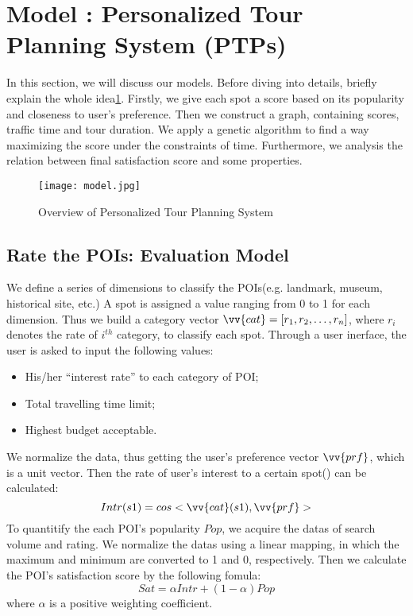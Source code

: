 \documentclass{mcmthesis}
\newcommand{\RNum}[1]{\uppercase\expandafter{\romannumeral #1\relax}}
\begin{document}
\section{Model \RNum{1}: Personalized Tour Planning System (PTPs)} \label{section:model1}
  In this section, we will discuss our models. Before diving into details, briefly explain the whole idea\ref{fig:model}. Firstly, we give each spot a score based on its popularity and closeness to user's preference. Then we construct a graph, containing scores, traffic time and tour duration. We apply a genetic algorithm to find a way maximizing the score under the constraints of time. Furthermore, we analysis the relation between final satisfaction score and some properties.
  \begin{figure}[ht]
    \centering
    \texttt{[image: model.jpg]}
    \caption{Overview of Personalized Tour Planning System}
    \label{fig:model}
  \end{figure}
\subsection{Rate the POIs: Evaluation Model}
  We define a series of dimensions to classify the POIs(e.g. landmark, museum, historical site, etc.) A spot is assigned a value ranging from 0 to 1 for each dimension. Thus we build a category vector $\vv{cat} = [r_{1}, r_{2}, \ldots, r_{n}]$, where $r_{i}$ denotes the rate of $i^{th}$ category, to classify each spot. Through a user inerface, the user is asked to input the following values:
  \begin{itemize}
    \item His/her ``interest rate'' to each category of POI;
    \item Total travelling time limit;
    \item Highest budget acceptable.
  \end{itemize}
  We normalize the data, thus getting the user's preference vector $\vv{prf}$, which is a unit vector. Then the rate of user's interest to a certain spot() can be calculated: 
  \[
    Intr(s1) = cos<\vv{cat}(s1),\vv{prf}>
  \]
  To quantitify the each POI's popularity $Pop$, we acquire the datas of search volume and rating. We normalize the datas using a linear mapping, in which the maximum and minimum are converted to 1 and 0, respectively. Then we calculate the POI's satisfaction score by the following fomula:
  \[
    Sat = \alpha Intr + (1-\alpha)Pop
  \]
  where $\alpha$ is a positive weighting coefficient.
\end{document}
